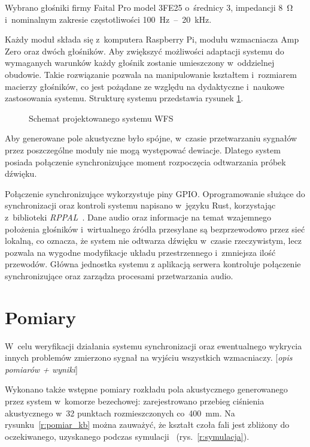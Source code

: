 \documentclass[10pt, a4paper]{article}
\let\Oldsection\section
\renewcommand{\section}{\FloatBarrier\Oldsection}
\begin{document}
Wybrano głośniki firmy Faital Pro model 3FE25
o~średnicy \SI{3}{\inch}, impedancji \SI{8}{\ohm} i~nominalnym zakresie 
częstotliwości \SI{100}{\hertz}~--~\SI{20}{\kilo\hertz}.

Każdy moduł składa się z~komputera Raspberry Pi, modułu wzmacniacza Amp Zero
oraz dwóch głośników.
Aby zwiększyć możliwości adaptacji systemu do wymaganych warunków
każdy głośnik zostanie umieszczony w~oddzielnej obudowie. Takie rozwiązanie
pozwala na manipulowanie kształtem i~rozmiarem macierzy głośników,
co jest pożądane ze względu na dydaktyczne i~naukowe zastosowania systemu.  
Strukturę systemu przedstawia rysunek \ref{fig:schemat}.

\begin{figure}[!tbh]
\centering
{}
\caption{Schemat projektowanego systemu WFS}
\label{fig:schemat}
\end{figure}

Aby generowane pole akustyczne było spójne, w~czasie przetwarzaniu sygnałów przez
poszczególne moduły nie mogą występować dewiacje. Dlatego system posiada połączenie
synchronizujące moment rozpoczęcia odtwarzania próbek dźwięku.

Połączenie synchronizujące wykorzystuje piny GPIO. Oprogramowanie służące do
synchronizacji oraz kontroli systemu napisano w~języku Rust, korzystając z~biblioteki 
\linebreak\emph{RPPAL}~\cite{RPPAL}. Dane audio oraz informacje na temat wzajemnego położenia 
głośników i~wirtualnego źródła przesyłane są bezprzewodowo przez sieć lokalną, co
oznacza, że system nie odtwarza dźwięku w~czasie rzeczywistym, lecz
pozwala na wygodne modyfikacje układu przestrzennego i~zmniejsza ilość
przewodów. Główna jednostka systemu z aplikacją serwera kontroluje połączenie
synchronizujące oraz zarządza procesami przetwarzania audio.

\section{Pomiary}

W~celu weryfikacji działania systemu synchronizacji oraz ewentualnego wykrycia innych 
problemów zmierzono sygnał na wyjściu wszystkich wzmacniaczy. [\textit{opis pomiarów + wyniki}]

Wykonano także wstępne pomiary rozkładu pola akustycznego generowanego przez system 
w~komorze bezechowej: zarejestrowano przebieg ciśnienia akustycznego w~32 punktach 
rozmieszczonych co~\SI{400}{\milli\metre}. Na rysunku~\ref{r:pomiar_kb} można zauważyć,
że kształt czoła fali jest zbliżony do oczekiwanego, uzyskanego podczas symulacji~
(rys.~\ref{r:symulacja}).
\end{document}
